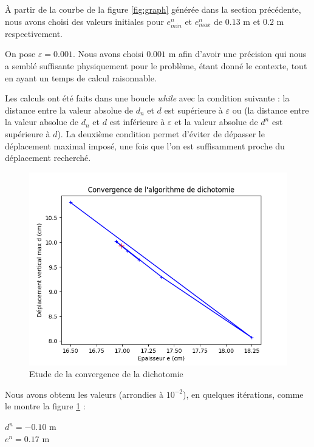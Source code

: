 \documentclass{article}
\begin{document}
    À partir de la courbe de la figure \ref{fig:graph} générée dans la section précédente, 
    nous avons choisi des valeurs initiales pour $e^n_{min}$ et $e^n_{max}$ de $0.13$ m et $0.2$ m respectivement.

    On pose $\varepsilon = 0.001$.
    Nous avons choisi $0.001$ m afin d'avoir une précision qui nous a semblé suffisante physiquement pour le problème, étant donné le contexte, tout en 
    ayant un temps de calcul raisonnable.

    Les calculs ont été faits dans une boucle \emph{while} avec la condition suivante :
    la distance entre la valeur absolue de $d_n$ et $d$ est supérieure à $\varepsilon$ ou (la distance entre la valeur absolue de $d_n$ et $d$ est inférieure à $\varepsilon$ 
    et la valeur absolue de $d^n$ est supérieure à $d$). La deuxième condition permet d'éviter de dépasser le déplacement maximal imposé, une fois que l'on est 
    suffisamment proche du déplacement recherché.   

    \begin{figure}   
        \begin{center}
        
            \includegraphics[width=12cm]{imgs/dicho.png}
            \caption{Etude de la convergence de la dichotomie}
            \label{fig:dicho}
        
        \end{center}
    \end{figure}

    Nous avons obtenu les valeurs (arrondies à $10^{-2}$), en quelques itérations, comme le montre la figure \ref{fig:dicho} :
    \begin{center}
    $d^n = - 0.10$ m    \\
    $e^n = 0.17$ m
    \end{center}
\end{document}
